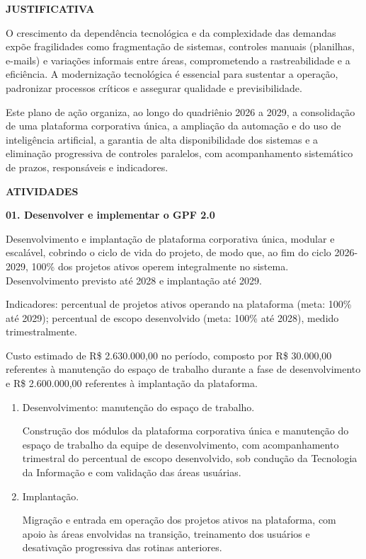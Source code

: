 \documentclass[12pt,a4paper]{article}
\newcommand{\secao}[1]{%
  \par\vspace{\dimexpr16pt-\parskip\relax}%
  {\noindent\bfseries\color{azulTitulo}\fontsize{13}{16}\selectfont #1}%
  \par\vspace{\dimexpr8pt-\parskip\relax}%
}
\newcommand{\atividade}[1]{%
  \par\vspace{\dimexpr16pt-\parskip\relax}%
  {\bfseries\color{azulAtividade}#1}%
  \par\vspace{\dimexpr8pt-\parskip\relax}%
}
\begin{document}
\secao{JUSTIFICATIVA}

O crescimento da dependência tecnológica e da complexidade das demandas expõe fragilidades como fragmentação de sistemas, controles manuais (planilhas, e-mails) e variações informais entre áreas, comprometendo a rastreabilidade e a eficiência. A modernização tecnológica é essencial para sustentar a operação, padronizar processos críticos e assegurar qualidade e previsibilidade.

Este plano de ação organiza, ao longo do quadriênio 2026 a 2029, a consolidação de uma plataforma corporativa única, a ampliação da automação e do uso de inteligência artificial, a garantia de alta disponibilidade dos sistemas e a eliminação progressiva de controles paralelos, com acompanhamento sistemático de prazos, responsáveis e indicadores.

\secao{ATIVIDADES}

\atividade{01. Desenvolver e implementar o GPF 2.0}

Desenvolvimento e implantação de plataforma corporativa única, modular e escalável, cobrindo o ciclo de vida do projeto, de modo que, ao fim do ciclo 2026-2029, 100\% dos projetos ativos operem integralmente no sistema. Desenvolvimento previsto até 2028 e implantação até 2029.

Indicadores: percentual de projetos ativos operando na plataforma (meta: 100\% até 2029); percentual de escopo desenvolvido (meta: 100\% até 2028), medido trimestralmente.

Custo estimado de R\$ 2.630.000,00 no período, composto por R\$ 30.000,00 referentes à manutenção do espaço de trabalho durante a fase de desenvolvimento e R\$ 2.600.000,00 referentes à implantação da plataforma.

\begin{enumerate}
  \item Desenvolvimento: manutenção do espaço de trabalho.

        Construção dos módulos da plataforma corporativa única e manutenção do espaço de trabalho da equipe de desenvolvimento, com acompanhamento trimestral do percentual de escopo desenvolvido, sob condução da Tecnologia da Informação e com validação das áreas usuárias.
  \item Implantação.

        Migração e entrada em operação dos projetos ativos na plataforma, com apoio às áreas envolvidas na transição, treinamento dos usuários e desativação progressiva das rotinas anteriores.
\end{enumerate}
\end{document}
